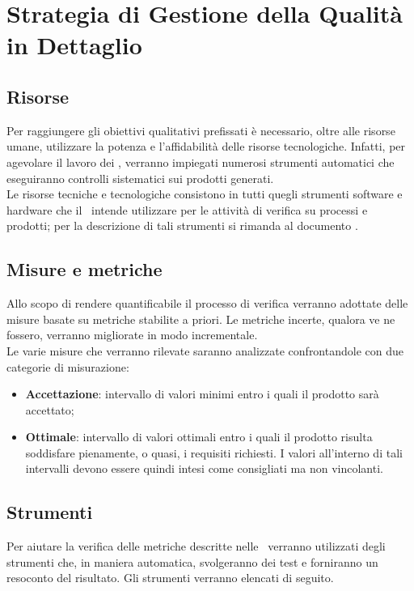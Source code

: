 \section{Strategia di Gestione della Qualità in Dettaglio}
\subsection{Risorse}
Per raggiungere gli obiettivi qualitativi prefissati è necessario, oltre alle risorse umane, utilizzare la potenza e l'affidabilità delle risorse tecnologiche. Infatti, per agevolare il lavoro dei \VerP, verranno impiegati numerosi strumenti automatici che eseguiranno controlli sistematici sui prodotti generati. \\
Le risorse tecniche e tecnologiche consistono in tutti quegli strumenti software e hardware che il \gruppo\ intende utilizzare per le attività di verifica su processi e prodotti; per la descrizione di tali strumenti si rimanda al documento \NdP.

\subsection{Misure e metriche}
Allo scopo di rendere quantificabile il processo di verifica verranno adottate delle misure basate su metriche stabilite a priori. Le metriche incerte, qualora ve ne fossero, verranno migliorate in modo incrementale. \\
Le varie misure che verranno rilevate saranno analizzate confrontandole con due categorie di misurazione:
\begin{itemize}
\item
\textbf{Accettazione}: intervallo di valori minimi entro i quali il prodotto sarà accettato;
\item
\textbf{Ottimale}: intervallo di valori ottimali entro i quali il prodotto risulta soddisfare pienamente, o quasi, i requisiti richiesti. I valori all'interno di tali intervalli devono essere quindi intesi come consigliati ma non vincolanti.
\end{itemize}

\subsection{Strumenti}
Per aiutare la verifica delle metriche descritte nelle \NdP\ verranno utilizzati degli strumenti che, in maniera automatica, svolgeranno dei test e forniranno un resoconto del risultato. Gli strumenti verranno elencati di seguito.

